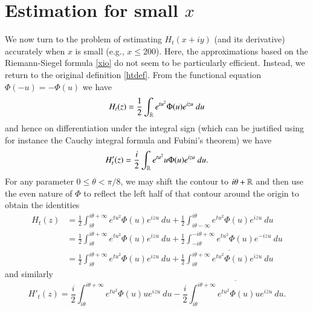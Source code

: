 \section{Estimation for small $x$}

We now turn to the problem of estimating $H_t(x+iy)$ (and its derivative) accurately when $x$ is small (e.g., $x \leq 200$).  Here, the approximations based on the Riemann-Siegel formula \eqref{xio} do not seem to be particularly efficient.  Instead, we return to the original definition \eqref{htdef}.  From the functional equation $\Phi(-u)=-\Phi(u)$ we have
$$H_t(z) = \frac{1}{2} \int_{\mathbb{R}} e^{tu^2} \Phi(u) e^{izu}\ du$$
and hence on differentiation under the integral sign (which can be justified using for instance the Cauchy integral formula and Fubini's theorem) we have
$$H'_t(z) = \frac{i}{2} \int_{\mathbb{R}} e^{tu^2} u \Phi(u) e^{izu}\ du.$$
For any parameter $0 \leq \theta < \pi/8$, we may shift the contour to $i\theta + \mathbb{R}$ and then use the even nature of $\Phi$ to reflect the left half of that contour around the origin to obtain the identities
\begin{equation}\label{ident-1}
\begin{split}
H_t(z) &= \frac{1}{2} \int_{i\theta}^{i\theta+\infty} e^{tu^2} \Phi(u) e^{izu}\ du + \frac{1}{2} \int_{i\theta-\infty}^{i\theta} e^{tu^2} \Phi(u) e^{izu}\ du \\
&= \frac{1}{2} \int_{i\theta}^{i\theta+\infty} e^{tu^2} \Phi(u) e^{izu}\ du + \frac{1}{2} \int_{-i\theta}^{-i\theta+\infty} e^{tu^2} \Phi(u) e^{-izu}\ du\\
&= \frac{1}{2} \int_{i\theta}^{i\theta+\infty} e^{tu^2} \Phi(u) e^{izu}\ du + \frac{1}{2} \overline{\int_{i\theta}^{i\theta+\infty} e^{tu^2} \Phi(u) e^{i\overline{z}u}\ du}
\end{split}\end{equation}
and similarly
\begin{equation}\label{ident-2}
H'_t(z) = \frac{i}{2} \int_{i\theta}^{i\theta+\infty} e^{tu^2} \Phi(u) u e^{izu}\ du - \frac{i}{2} \overline{\int_{i\theta}^{i\theta+\infty} e^{tu^2} \Phi(u) u e^{i\overline{z}u}\ du}.
\end{equation}

